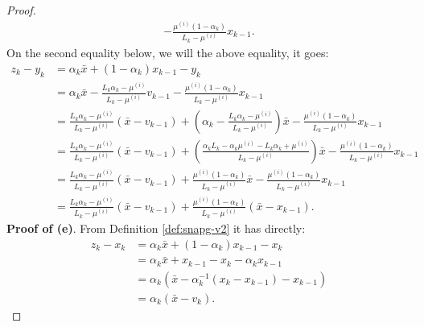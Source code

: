\documentclass[12pt]{article}
\begin{document}
\begin{proof}
\begin{align*}
                - \frac{\mu^{(i)}(1 - \alpha_k)}{L_k - \mu^{(i)}} x_{k - 1}. 
            \end{align*}
            On the second equality below, we will the above equality, it goes: 
            \begin{align*}
                z_k - y_k &= 
                \alpha_k \bar x + (1 - \alpha_k)x_{k - 1} - y_k
                \\
                &= \alpha_k \bar x 
                - \frac{L_k\alpha_k - \mu^{(i)}}{L_k - \mu^{(i)}} v_{k - 1} 
                - \frac{\mu^{(i)}(1 - \alpha_k)}{L_k - \mu^{(i)}} x_{k - 1}
                \\
                &= \frac{L_k\alpha_k - \mu^{(i)}}{L_k - \mu^{(i)}}(\bar x - v_{k - 1})
                + \left(
                    \alpha_k - \frac{L_k\alpha_k - \mu^{(i)}}{L_k - \mu^{(i)}}
                \right)\bar x
                - \frac{\mu^{(i)}(1 - \alpha_k)}{L_k - \mu^{(i)}} x_{k - 1}
                \\
                &= \frac{L_k\alpha_k - \mu^{(i)}}{L_k - \mu^{(i)}}(\bar x - v_{k - 1})
                + \left(
                    \frac{\alpha_kL_k - \alpha_k \mu^{(i)} - L_k\alpha_k + \mu^{(i)}}{L_k - \mu^{(i)}}
                \right)\bar x
                - \frac{\mu^{(i)}(1 - \alpha_k)}{L_k - \mu^{(i)}} x_{k - 1}
                \\
                &= \frac{L_k\alpha_k - \mu^{(i)}}{L_k - \mu^{(i)}}(\bar x - v_{k - 1})
                + \frac{\mu^{(i)}(1 - \alpha_k)}{L_k - \mu^{(i)}}\bar x
                - \frac{\mu^{(i)}(1 - \alpha_k)}{L_k - \mu^{(i)}} x_{k - 1}
                \\
                &= \frac{L_k\alpha_k - \mu^{(i)}}{L_k - \mu^{(i)}}(\bar x - v_{k - 1})
                + \frac{\mu^{(i)}(1 - \alpha_k)}{L_k - \mu^{(i)}}(\bar x - x_{k - 1}).
            \end{align*}
            \textbf{Proof of (e)}.
            From Definition \ref{def:snapg-v2} it has directly: 
            \begin{align*}
                z_k - x_k &= \alpha_k \bar x + (1 - \alpha_k)x_{k - 1} - x_k
                \\
                &= \alpha_k \bar x + x_{k - 1} - x_k - \alpha_k x_{k - 1}
                \\
                &= \alpha_k(\bar x - \alpha_k^{-1}(x_k - x_{k - 1}) - x_{k - 1})
                \\
                &= \alpha_k (\bar x - v_k).

\end{align*}
\end{proof}
\end{document}
